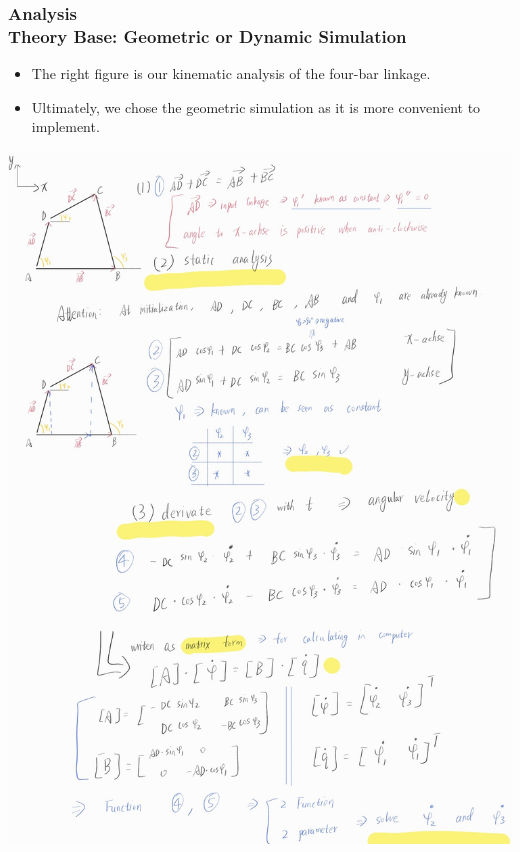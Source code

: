 \documentclass[ucs,10pt]{beamer}
\begin{document}
\begin{frame}
\frametitle{Analysis\\
	\small \color{rwth-blue} Theory Base: Geometric or Dynamic Simulation}
	\begin{minipage}{0.4\linewidth}
		\begin{itemize}
			\item The right figure is our kinematic analysis of the four-bar linkage.
			\item Ultimately, we chose the geometric simulation as it is more convenient to implement.
		\end{itemize}
	\end{minipage}
	\hspace{0.02\linewidth} %
	\begin{minipage}{0.5\linewidth}
		\begin{center}
			\includegraphics[width=\linewidth]{./Figures/dynamic_analysis_1.jpg}
		\end{center}
	\end{minipage}
\end{frame}
\end{document}

